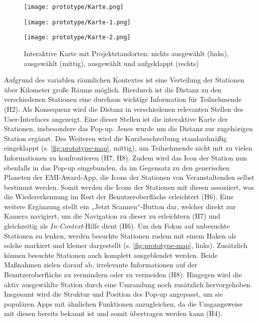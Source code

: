 \begin{figure}[htpb]
    \begin{minipage}{.33\textwidth}
        \centering
        \texttt{[image: prototype/Karte.png]}
    \end{minipage}%
    \begin{minipage}{.33\textwidth}
        \centering
        \texttt{[image: prototype/Karte-1.png]}
    \end{minipage}
    \begin{minipage}{.33\textwidth}
        \centering
        \texttt{[image: prototype/Karte-2.png]}
    \end{minipage}
    \caption{Interaktive Karte mit Projektstandorten: nichts ausgewählt (links), ausgewählt (mittig), ausgewählt und aufgeklappt (rechts)}
    \label{fig:prototype-map}
\end{figure}

Aufgrund des variablen räumlichen Kontextes ist eine Verteilung der Stationen
über Kilometer große Räume möglich. Hierdurch ist die Distanz zu den
verschiedenen Stationen eine durchaus wichtige Information für Teilnehmende
(H2). Als Konsequenz wird die Distanz in verschiedenen relevanten Stellen des
User-Interfaces angezeigt. Eine dieser Stellen ist die interaktive Karte der
Stationen, insbesondere das Pop-up. Jenes wurde um die Distanz zur zugehörigen
Station ergänzt. Des Weiteren wird die Kurzbeschreibung standardmäßig
eingeklappt (s. \autoref{fig:prototype-map}, mittig), um Teilnehmende nicht mit
zu vielen Informationen zu konfrontieren (H7, H8). Zudem wird das Icon der
Station nun ebenfalls in das Pop-up eingebunden, da im Gegensatz zu den
generischen Planeten der EMI-Award-App, die Icons der Stationen von
Veranstaltenden selbst bestimmt werden. Somit werden die Icons der Stationen mit
diesen assoziiert, was die Wiedererkennung im Rest der Benutzeroberfläche
erleichtert (H6). Eine weitere Ergänzung stellt ein „Jetzt Scannen“-Button dar,
welcher direkt zur Kamera navigiert, um die Navigation zu dieser zu erleichtern
(H7) und gleichzeitig als \textit{In-Context}-Hilfe dient (H6). Um den Fokus auf
unbesuchte Stationen zu lenken, werden besuchte Stationen zudem mit einem Haken
als solche markiert und kleiner dargestellt (s. \autoref{fig:prototype-map},
links). Zusätzlich können besuchte Stationen auch komplett ausgeblendet werden.
Beide Maßnahmen zielen darauf ab, irrelevante Informationen auf der
Benutzeroberfläche zu vermindern oder zu vermeiden (H8). Hingegen wird die aktiv
ausgewählte Station durch eine Umrandung noch zusätzlich hervorgehoben.
Insgesamt wird die Struktur und Position des Pop-up angepasst, um sie populären
Apps mit ähnlichen Funktionen anzugleichen, da die Umgangsweise mit diesen
bereits bekannt ist und somit übertragen werden kann (H4).

